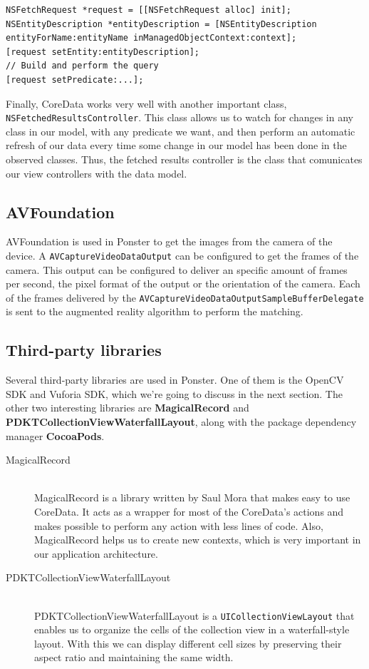 \begin{verbatim}
NSFetchRequest *request = [[NSFetchRequest alloc] init];
NSEntityDescription *entityDescription = [NSEntityDescription
entityForName:entityName inManagedObjectContext:context];
[request setEntity:entityDescription];
// Build and perform the query
[request setPredicate:...];
\end{verbatim}

Finally, CoreData works very well with another important class,
\texttt{NSFetched\-Results\-Controller}. This class allows us to watch for changes in
any class in our model, with any predicate we want, and then perform an automatic
refresh of our data every time some change in our model has been done in the
observed classes. Thus, the fetched results controller is the class that comunicates
our view controllers with the data model.

\subsection{AVFoundation}
AVFoundation is used in Ponster to get the images from the camera of the device. A
\texttt{AVCaptureVideoDataOutput} can be configured to get the frames of the
camera. This output can be configured to deliver an specific amount of frames per
second, the pixel format of the output or the orientation of the camera. Each of the
frames delivered by the \texttt{AVCaptureVideoDataOutputSample\-Buffer\-Delegate} is
sent to the augmented reality algorithm to perform the matching.

\subsection{Third-party libraries}
Several third-party libraries are used in Ponster. One of them is the OpenCV SDK and
Vuforia SDK, which we're going to discuss in the next section. The other two
interesting libraries are \textbf{MagicalRecord} and
\textbf{PDKTCollectionViewWaterfallLayout}, along with the package dependency
manager \textbf{CocoaPods}.

\begin{description}
\item [MagicalRecord] \hfill \\
MagicalRecord\cite{gh:mr} is a library written by Saul Mora that makes easy to use
CoreData. It acts as a wrapper for most of the CoreData's actions and makes possible
to perform any action with less lines of code. Also, MagicalRecord helps us to create new
contexts, which is very important in our application architecture.
\item [PDKTCollectionViewWaterfallLayout] \hfill \\
PDKTCollectionViewWaterfallLayout is a \texttt{UICollectionViewLayout} that enables
us to organize the cells of the collection view in a waterfall-style layout. With
this we can display different cell sizes by preserving their aspect ratio and
maintaining the same width.
\end{description}

